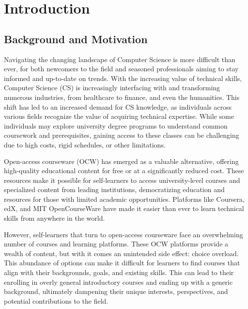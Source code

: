 \chapter{Introduction} \label{chap:chap-1}







\section{Background and Motivation}

Navigating the changing landscape of Computer Science is more difficult than ever, for both newcomers to the field and seasoned professionals aiming to stay informed and up-to-date on trends. With the increasing value of technical skills, Computer Science (CS) is increasingly interfacing with and transforming numerous industries, from healthcare to finance, and even the humanities. This shift has led to an increased demand for CS knowledge, as individuals across various fields recognize the value of acquiring technical expertise. While some individuals may explore university degree programs to understand common coursework and prerequisites, gaining access to these classes can be challenging due to high costs, rigid schedules, or other limitations.

Open-access courseware (OCW) has emerged as a valuable alternative, offering high-quality educational content for free or at a significantly reduced cost. These resources make it possible for self-learners to access university-level courses and specialized content from leading institutions, democratizing education and resources for those with limited academic opportunities. Platforms like Coursera, edX, and MIT OpenCourseWare have made it easier than ever to learn technical skills from anywhere in the world.

However, self-learners that turn to open-access courseware face an overwhelming number of courses and learning platforms. These OCW platforms provide a wealth of content, but with it comes an unintended side effect: choice overload. This abundance of options can make it difficult for learners to find courses that align with their backgrounds, goals, and existing skills. This can lead to their enrolling in overly general introductory courses and ending up with a generic background, ultimately dampening their unique interests, perspectives, and potential contributions to the field.

